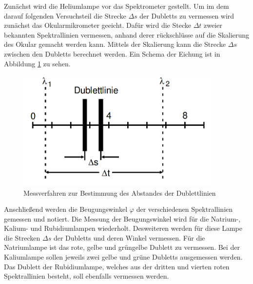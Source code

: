 Zunächst wird die Heliumlampe vor das Spektrometer gestellt. Um im dem darauf folgenden Versuchsteil die Strecke $\Delta s$ der Dubletts zu vermessen wird zunächst das Okularmikrometer geeicht. Dafür wird die Stecke $\Delta t$ zweier bekannten Spektrallinien vermessen, anhand derer rückschlüsse auf die Skalierung des Okular gemacht werden kann. Mittels der Skalierung kann die Strecke $\Delta s$ zwischen den Dubletts berechnet werden. Ein Schema der Eichung ist in Abbildung \ref{fig:dup} zu sehen.
\begin{figure}
  \centering
  \includegraphics[height=6cm]{picture/Duplet.png}
  \caption{Messverfahren zur Bestimmung des Abstandes der Dublettlinien \cite{sample}}
  \label{fig:dup}
\end{figure}
Anschließend werden die Beugungswinkel $\varphi$ der verschiedenen Spektrallinien gemessen und notiert. Die Messung der Beugungswinkel wird für die Natrium-, Kalium- und Rubidiumlampen wiederholt. Desweiteren werden für diese Lampe die Strecken $\Delta s$ der Dubletts und deren Winkel vermessen. Für die Natriumlampe ist das rote, gelbe und grüngelbe Dublett zu vermessen.  Bei der Kaliumlampe sollen jeweils zwei gelbe und grüne Dubletts ausgemessen werden. Das Dublett der Rubidiumlampe, welches aus der dritten und vierten roten Spektrallinien besteht, soll ebenfalls vermessen werden.
